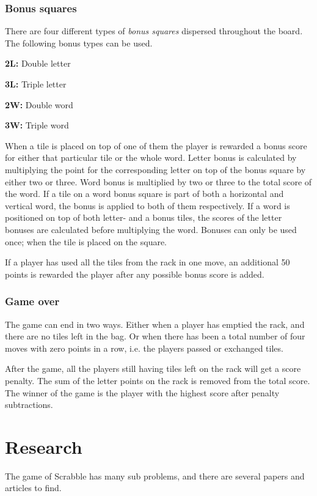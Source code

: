 \documentclass[a4paper, 12pt]{report}
\begin{document}
\subsubsection{Bonus squares}
There are four different types of \emph{bonus squares} dispersed throughout the board. The following bonus types can be used.

\begin{description}
\item{\bf 2L:} Double letter
\item{\bf 3L:} Triple letter
\item{\bf 2W:} Double word
\item{\bf 3W:} Triple word
\end{description}

When a tile is placed on top of one of them the player is rewarded a bonus score for either that particular tile or the whole word. Letter bonus is calculated by multiplying the point for the corresponding letter on top of the bonus square by either two or three. Word bonus is multiplied by two or three to the total score of the word. If a tile on a word bonus square is part of both a horizontal and vertical word, the bonus is applied to both of them respectively. If a word is positioned on top of both letter- and a bonus tiles, the scores of the letter bonuses are calculated before multiplying the word. Bonuses can only be used once; when the tile is placed on the square.

If a player has used all the tiles from the rack in one move, an additional 50 points is rewarded the player after any possible bonus score is added.

\subsubsection{Game over}
The game can end in two ways. Either when a player has emptied the rack, and there are no tiles left in the bag. Or when there has been a total number of four moves with zero points in a row, i.e. the players passed or exchanged tiles.

After the game, all the players still having tiles left on the rack will get a score penalty. The sum of the letter points on the rack is removed from the total score. The winner of the game is the player with the highest score after penalty subtractions. 

\section{Research}
The game of Scrabble has many sub problems, and there are several papers and articles to find.
\end{document}
